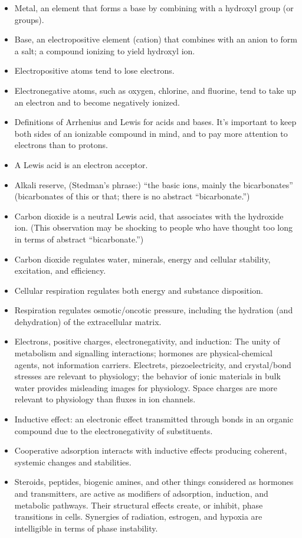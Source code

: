 \documentclass{article}
\begin{document}
\begin{itemize}
    \item Metal, an element that forms a base by combining with a hydroxyl group (or groups).
    \item Base, an electropositive element (cation) that combines with an anion to form a salt; a compound ionizing to yield hydroxyl ion.
    \item Electropositive atoms tend to lose electrons.
    \item Electronegative atoms, such as oxygen, chlorine, and fluorine, tend to take up an electron and to become negatively ionized.
    \item Definitions of Arrhenius and Lewis for acids and bases. It’s important to keep both sides of an ionizable compound in mind, and to pay more attention to electrons than to protons.
    \item A Lewis acid is an electron acceptor.
    \item Alkali reserve, (Stedman’s phrase:) “the basic ions, mainly the bicarbonates” (bicarbonates of this or that; there is no abstract “bicarbonate.”)
    \item Carbon dioxide is a neutral Lewis acid, that associates with the hydroxide ion. (This observation may be shocking to people who have thought too long in terms of abstract “bicarbonate.”)
    \item Carbon dioxide regulates water, minerals, energy and cellular stability, excitation, and efficiency.
    \item Cellular respiration regulates both energy and substance disposition.
    \item Respiration regulates osmotic/oncotic pressure, including the hydration (and dehydration) of the extracellular matrix.
    \item Electrons, positive charges, electronegativity, and induction: The unity of metabolism and signalling interactions; hormones are physical-chemical agents, not information carriers. Electrets, piezoelectricity, and crystal/bond stresses are relevant to physiology; the behavior of ionic materials in bulk water provides misleading images for physiology. Space charges are more relevant to physiology than fluxes in ion channels.
    \item Inductive effect: an electronic effect transmitted through bonds in an organic compound due to the electronegativity of substituents.
    \item Cooperative adsorption interacts with inductive effects producing coherent, systemic changes and stabilities.
    \item Steroids, peptides, biogenic amines, and other things considered as hormones and transmitters, are active as modifiers of adsorption, induction, and metabolic pathways. Their structural effects create, or inhibit, phase transitions in cells. Synergies of radiation, estrogen, and hypoxia are intelligible in terms of phase instability.

\end{itemize}
\end{document}
